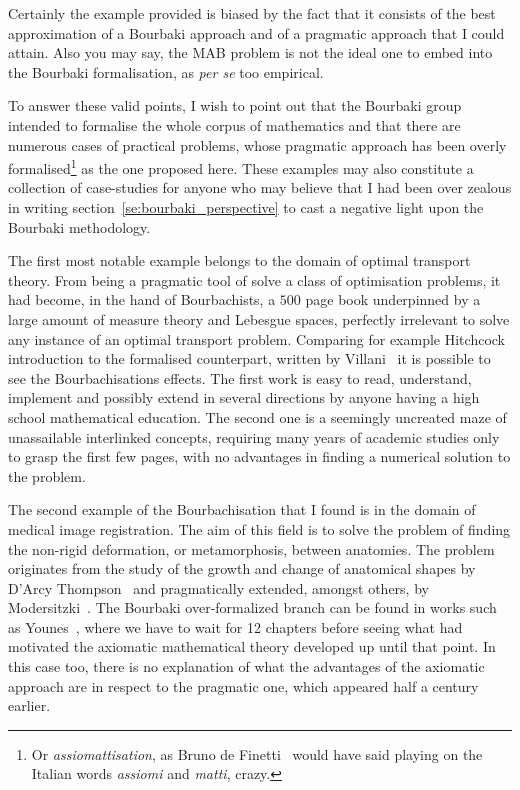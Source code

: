 \documentclass[]{scrartcl}
\theoremstyle{definition}
\begin{document}
Certainly the example provided is biased by the fact that it consists of the best approximation of a Bourbaki approach and of a pragmatic approach that I could attain. Also you may say, the MAB problem is not the ideal one to embed into the Bourbaki formalisation, as \emph{per se} too empirical.

To answer these valid points, I wish to point out that the Bourbaki group intended to formalise the whole corpus of mathematics and that there are numerous cases of practical problems, whose pragmatic approach has been overly formalised\footnote{
    Or \emph{assiomattisation}, as Bruno de Finetti~\cite{de2008bruno} would have said playing on the Italian words \emph{assiomi} and \emph{matti}, crazy.
} as the one proposed here. These examples may also constitute a collection of case-studies for anyone who may believe that I  had been over zealous in writing section~\ref{se:bourbaki_perspective} to cast a negative light upon the Bourbaki methodology.

The first most notable example belongs to the domain of optimal transport theory. From being a pragmatic tool of solve a class of optimisation problems, it had become, in the hand of Bourbachists, a $500$ page book underpinned by a large amount of measure theory and Lebesgue spaces, perfectly irrelevant to solve any instance of an optimal transport problem. Comparing for example Hitchcock~\cite{hitchcock1941distribution} introduction to the formalised counterpart, written by Villani~\cite{villani2003topics} it is possible to see the Bourbachisations effects. The first work is easy to read, understand, implement and possibly extend in several directions by anyone having a high school mathematical education. The second one is a seemingly uncreated maze of unassailable interlinked concepts, requiring many years of academic studies only to grasp the first few pages, with no advantages in finding a numerical solution to the problem. %

The second example of the Bourbachisation that I found is in the domain of medical image registration. The aim of this field is to solve the problem of finding the non-rigid deformation, or metamorphosis, between anatomies. The problem originates from the study of the growth and change of anatomical shapes by D'Arcy Thompson~\cite{d1942growth} and pragmatically extended, amongst others, by Modersitzki~\cite{modersitzki2004numerical}. The Bourbaki over-formalized branch can be found in works such as Younes~\cite{younes2010shapes}, where we have to wait for 12 chapters before seeing what had motivated the axiomatic mathematical theory developed up until that point.
In this case too, there is no explanation of what the advantages of the axiomatic approach are in respect to the pragmatic one, which appeared half a century earlier.
\end{document}
